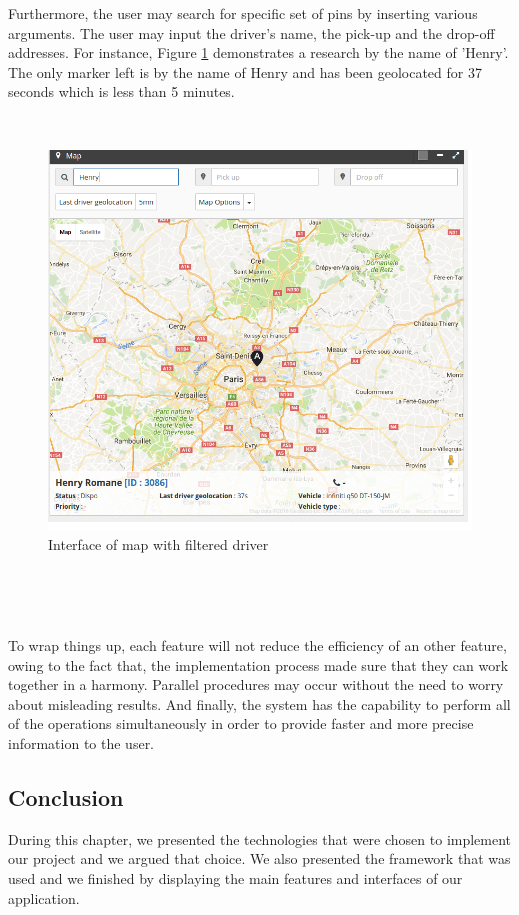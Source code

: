 Furthermore, the user may search for specific set of pins by inserting various arguments. The user may input the driver's name, the pick-up and the drop-off addresses. For instance, Figure \ref{int8} demonstrates a research by the name of 'Henry'. The only marker left is by the name of Henry and has been geolocated for 37 seconds which is less than 5 minutes.

~

\begin{figure}[!htbp] 
\begin{center}
\includegraphics[width=6 in]{images/achievement/8.png}
\caption{Interface of map with filtered driver}
\label{int8}
\end{center}
\end{figure}~

~~


To wrap things up, each feature will not reduce the efficiency of an other feature, owing to the fact that, the implementation process made sure that they can work together in a harmony. Parallel procedures may occur without the need to worry about misleading results. And finally, the system has the capability to perform all of the operations simultaneously in order to provide faster and more precise information to the user.

\subsection *{Conclusion}
During this chapter, we presented the technologies that were chosen to implement our project and we argued that choice. We also presented the framework that was used and we finished by displaying the main features and interfaces of our application.



